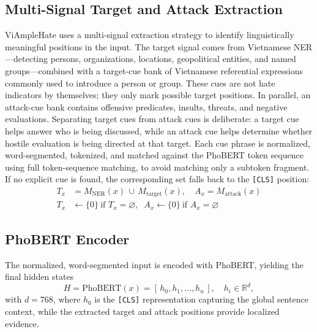\documentclass[11pt]{article}
\begin{document}
\subsection{Multi-Signal Target and Attack Extraction}
ViAmpleHate uses a multi-signal extraction strategy to identify linguistically meaningful positions in the input. The target signal comes from Vietnamese NER---detecting persons, organizations, locations, geopolitical entities, and named groups---combined with a target-cue bank of Vietnamese referential expressions commonly used to introduce a person or group. These cues are not hate indicators by themselves; they only mark possible target positions. In parallel, an attack-cue bank contains offensive predicates, insults, threats, and negative evaluations. Separating target cues from attack cues is deliberate: a target cue helps answer who is being discussed, while an attack cue helps determine whether hostile evaluation is being directed at that target. Each cue phrase is normalized, word-segmented, tokenized, and matched against the PhoBERT token sequence using full token-sequence matching, to avoid matching only a subtoken fragment. If no explicit cue is found, the corresponding set falls back to the \texttt{[CLS]} position:
\begin{align}
  T_x &= M_{\mathrm{NER}}(x)\,\cup\,M_{\mathrm{target}}(x), \quad A_x = M_{\mathrm{attack}}(x) \\
  T_x &\leftarrow \{0\}\ \text{if } T_x=\varnothing, \;\; A_x \leftarrow \{0\}\ \text{if } A_x=\varnothing \nonumber
\end{align}

\subsection{PhoBERT Encoder}
The normalized, word-segmented input is encoded with PhoBERT, yielding the final hidden states
\begin{equation}
  H = \mathrm{PhoBERT}(x) = [\,h_0, h_1, \dots, h_n\,], \quad h_i \in \mathbb{R}^{d},
\end{equation}
with $d=768$, where $h_0$ is the \texttt{[CLS]} representation capturing the global sentence context, while the extracted target and attack positions provide localized evidence.
\end{document}
